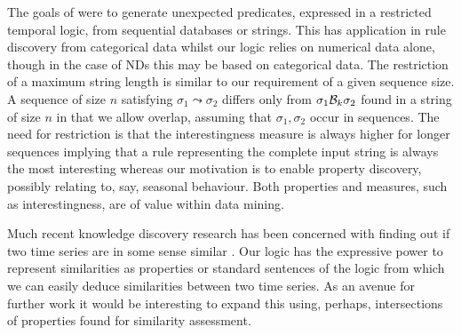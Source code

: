 The goals of \cite{bt98} were to generate unexpected predicates,
expressed in a restricted temporal logic, from sequential databases or
strings. This has application in rule discovery from categorical data
whilst our logic relies on numerical data alone, though in the case of
NDs this may be based on categorical data. The restriction of a
maximum string length is similar to our requirement of a given
sequence size. A sequence of size $n$ satisfying $\sigma_1 \leadsto
\sigma_2$ differs only from $\sigma_1 {\cal B}_k 
\sigma_2$ found in a string of size $n$ in that we allow overlap,
assuming that $\sigma_1,\sigma_2$ occur in sequences. The need
for restriction is 
that the interestingness measure is always higher for longer sequences
implying that a rule representing the complete input string is always
the most interesting whereas our motivation is to enable property
discovery, possibly relating to, say, seasonal behaviour.
Both properties and measures, such as interestingness, are of value
within data mining.

\smallskip

Much recent knowledge discovery research has been concerned with
finding out if two time series are in some sense similar
\cite{frm94,alss95,dgm97}. Our logic has the expressive power to represent
similarities as properties or standard sentences of the logic from
which we can easily deduce similarities between two time series. As an
avenue for further work it
would be interesting to expand this using, perhaps, intersections of
properties found for similarity assessment.

